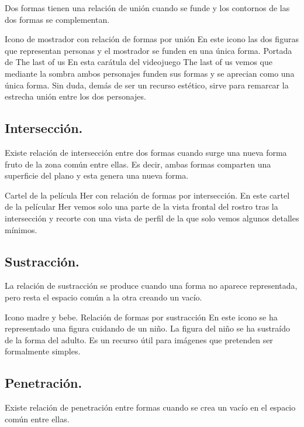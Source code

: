 \documentclass[
  16pt,
]{krantz}
\theoremstyle{definition}
\theoremstyle{definition}
\theoremstyle{definition}
\theoremstyle{definition}
\theoremstyle{remark}
\begin{document}
Dos formas tienen una relación de unión cuando se funde y los contornos de las dos formas se complementan.

Icono de mostrador con relación de formas por unión
En este icono las dos figuras que representan personas y el mostrador se funden en una única forma.
Portada de The last of us
En esta carátula del videojuego The last of us vemos que mediante la sombra ambos personajes funden sus formas y se aprecian como una única forma. Sin duda, demás de ser un recurso estético, sirve para remarcar la estrecha unión entre los dos personajes.

\hypertarget{intersecciuxf3n.}{%
\subsection{Intersección.}\label{intersecciuxf3n.}}

Existe relación de intersección entre dos formas cuando surge una nueva forma fruto de la zona común entre ellas. Es decir, ambas formas comparten una superficie del plano y esta genera una nueva forma.

Cartel de la película Her con relación de formas por intersección.
En este cartel de la películar Her vemos solo una parte de la vista frontal del rostro tras la intersección y recorte con una vista de perfil de la que solo vemos algunos detalles mínimos.

\hypertarget{sustracciuxf3n.}{%
\subsection{Sustracción.}\label{sustracciuxf3n.}}

La relación de sustracción se produce cuando una forma no aparece representada, pero resta el espacio común a la otra creando un vacío.

Icono madre y bebe. Relación de formas por sustracción
En este icono se ha representado una figura cuidando de un niño. La figura del niño se ha sustraído de la forma del adulto. Es un recurso útil para imágenes que pretenden ser formalmente simples.

\hypertarget{penetraciuxf3n.}{%
\subsection{Penetración.}\label{penetraciuxf3n.}}

Existe relación de penetración entre formas cuando se crea un vacío en el espacio común entre ellas.
\end{document}
